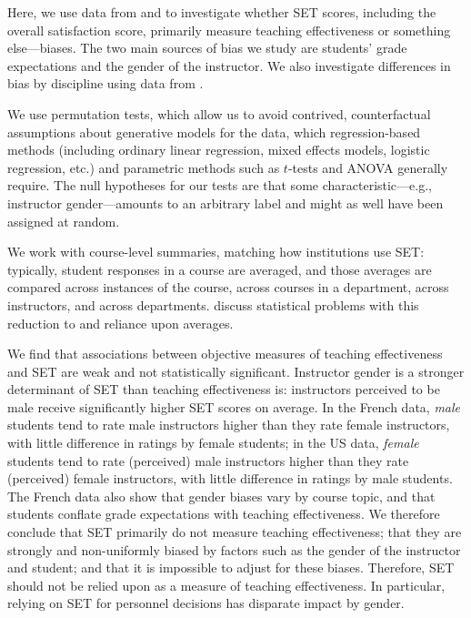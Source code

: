 \documentclass[12pt]{article}
\begin{document}
Here, we use data from \citet{Boring2015} and \citet{MacNell2014} to investigate 
whether SET scores, including the overall satisfaction score, 
primarily measure teaching effectiveness or something else---biases.
The two main sources of bias we study are students' grade expectations and the gender of the 
instructor. 
We also investigate differences in bias by discipline using data from \citet{Boring2015}.

We use permutation tests, which allow us to avoid 
contrived, counterfactual assumptions about
generative models for the data, which regression-based methods (including
ordinary linear regression, mixed effects models, logistic regression, etc.) and parametric
methods such as $t$-tests and ANOVA generally require.
The null hypotheses for our tests are that some 
characteristic---e.g., instructor gender---amounts to an arbitrary label and might as well
have been assigned at random. 

We work with course-level summaries, matching how institutions use SET: 
typically, student responses in a course
are averaged, and those averages are compared across instances of the course,
across courses in a department, across instructors, and across departments.
\citet{StarkFreishtat2014} discuss statistical problems with this reduction to 
and reliance upon averages.

We find that associations between objective measures of teaching effectiveness and SET are weak
and not statistically significant.
Instructor gender is a stronger determinant of SET than teaching effectiveness is:
instructors perceived to be male receive significantly higher SET scores on average.
In the French data, \emph{male} students tend to rate male instructors higher
than they rate female instructors, with little difference in ratings by female students;
in the US data, \emph{female} students tend to rate (perceived) male instructors 
higher than they rate (perceived) female instructors, with little difference in ratings by male students. 
The French data also show that gender biases vary by course topic, and 
that students conflate grade expectations with teaching effectiveness.
We therefore conclude that SET primarily do not measure teaching effectiveness; that 
they are strongly and non-uniformly biased by factors such as the gender of the instructor
and student; and that it is impossible to adjust for these biases. 
Therefore, SET should not be relied upon as a measure of teaching effectiveness.
In particular, relying on SET for personnel decisions has disparate impact by gender. 
\end{document}
